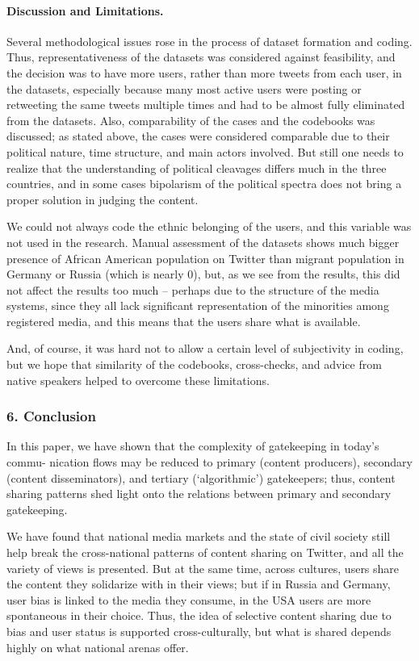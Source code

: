 \paragraph{Discussion and Limitations.} Several methodological issues rose in the process of dataset formation and coding. Thus, representativeness of the datasets was considered against feasibility, and the decision was to have more users, rather than more tweets from each user, in the datasets, especially because many most active users were posting or retweeting the same tweets multiple times and had to be almost fully eliminated from the datasets. Also, comparability of the cases and the codebooks was discussed; as stated above, the cases were considered comparable due to their political nature, time structure, and main actors involved. But still one needs to realize that the understanding of political cleavages differs much in the three countries, and in some cases bipolarism of the political spectra does not bring a proper solution in judging the content.

We could not always code the ethnic belonging of the users, and this variable was not used in the research. Manual assessment of the datasets shows much bigger presence of African American population on Twitter than migrant population in Germany or Russia (which is nearly 0), but, as we see from the results, this did not affect the results too much -- perhaps due to the structure of the media systems, since they all lack significant representation of the minorities among registered media, and this means that the users share what is available.

And, of course, it was hard not to allow a certain level of subjectivity in coding, but we hope that similarity of the codebooks, cross-checks, and advice from native speakers helped to overcome these limitations.

\subsubsection{6. Conclusion}
In this paper, we have shown that the complexity of gatekeeping in today’s commu- nication flows may be reduced to primary (content producers), secondary (content disseminators), and tertiary (‘algorithmic’) gatekeepers; thus, content sharing patterns shed light onto the relations between primary and secondary gatekeeping.

We have found that national media markets and the state of civil society still help break the cross-national patterns of content sharing on Twitter, and all the variety of views is presented. But at the same time, across cultures, users share the content they solidarize with in their views; but if in Russia and Germany, user bias is linked to the media they consume, in the USA users are more spontaneous in their choice. Thus, the idea of selective content sharing due to bias and user status is supported cross-culturally, but what is shared depends highly on what national arenas offer.

